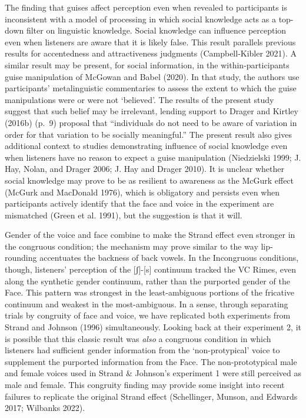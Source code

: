 \documentclass[
  letterpaper,
  DIV=11,
  numbers=noendperiod]{scrartcl}
\begin{document}
The finding that guises affect perception even when revealed to
participants is inconsistent with a model of processing in which social
knowledge acts as a top-down filter on linguistic knowledge. Social
knowledge can influence perception even when listeners are aware that it
is likely false. This result parallels previous results for accentedness
and attractiveness judgments (Campbell-Kibler 2021). A similar result
may be present, for social information, in the within-participants guise
manipulation of McGowan and Babel (2020). In that study, the authors use
participants' metalinguistic commentaries to assess the extent to which
the guise manipulations were or were not `believed'. The results of the
present study suggest that such belief may be irrelevant, lending
support to Drager and Kirtley (2016b) (p.~9) proposal that ``individuals
do not need to be aware of variation in order for that variation to be
socially meaningful.'' The present result also gives additional context
to studies demonstrating influence of social knowledge even when
listeners have no reason to expect a guise manipulation (Niedzielski
1999; J. Hay, Nolan, and Drager 2006; J. Hay and Drager 2010). It is
unclear whether social knowledge may prove to be as resilient to
awareness as the McGurk effect (McGurk and MacDonald 1976), which is
obligatory and persists even when participants actively identify that
the face and voice in the experiment are mismatched (Green et al. 1991),
but the suggestion is that it will.

Gender of the voice and face combine to make the Strand effect even
stronger in the congruous condition; the mechanism may prove similar to
the way lip-rounding accentuates the backness of back vowels. In the
Incongruous conditions, though, listeners' perception of the
{[}ʃ{]}-{[}s{]} continuum tracked the VC Rimes, even along the synthetic
gender continuum, rather than the purported gender of the Face. This
pattern was strongest in the least-ambiguous portions of the fricative
continuum and weakest in the most-ambiguous. In a sense, through
separating trials by congruity of face and voice, we have replicated
both experiments from Strand and Johnson (1996) simultaneously. Looking
back at their experiment 2, it is possible that this classic result was
\emph{also} a congruous condition in which listeners had sufficient
gender information from the `non-protypical' voice to supplement the
purported information from the Face. The non-prototypical male and
female voices used in Strand \& Johnson's experiment 1 were still
perceived as male and female. This congruity finding may provide some
insight into recent failures to replicate the original Strand effect
(Schellinger, Munson, and Edwards 2017; Wilbanks 2022).
\end{document}
